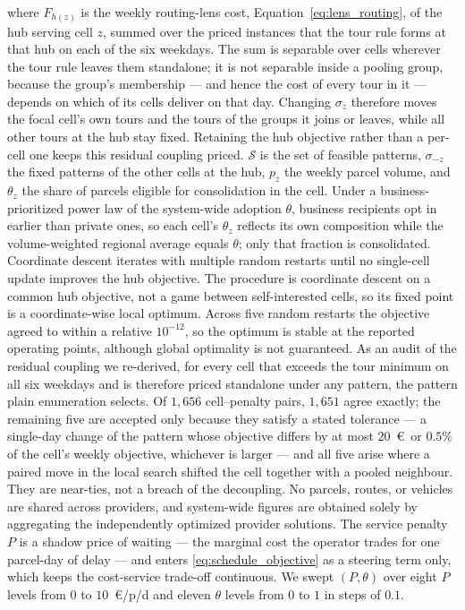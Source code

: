 \documentclass[preprint,12pt,authoryear]{elsarticle}
\begin{document}
where $F_{h(z)}$ is the weekly routing-lens cost, Equation~\eqref{eq:lens_routing}, of the hub serving cell $z$, summed over the priced instances that the tour rule forms at that hub on each of the six weekdays. The sum is separable over cells wherever the tour rule leaves them standalone; it is not separable inside a pooling group, because the group's membership --- and hence the cost of every tour in it --- depends on which of its cells deliver on that day. Changing $\sigma_z$ therefore moves the focal cell's own tours and the tours of the groups it joins or leaves, while all other tours at the hub stay fixed. Retaining the hub objective rather than a per-cell one keeps this residual coupling priced. $\mathcal{S}$ is the set of feasible patterns, $\sigma_{-z}$ the fixed patterns of the other cells at the hub, $p_z$ the weekly parcel volume, and $\theta_z$ the share of parcels eligible for consolidation in the cell. Under a business-prioritized power law of the system-wide adoption $\theta$, business recipients opt in earlier than private ones, so each cell's $\theta_z$ reflects its own composition while the volume-weighted regional average equals $\theta$; only that fraction is consolidated. Coordinate descent iterates with multiple random restarts until no single-cell update improves the hub objective. The procedure is coordinate descent on a common hub objective, not a game between self-interested cells, so its fixed point is a coordinate-wise local optimum. Across five random restarts the objective agreed to within a relative $10^{-12}$, so the optimum is stable at the reported operating points, although global optimality is not guaranteed. As an audit of the residual coupling we re-derived, for every cell that exceeds the tour minimum on all six weekdays and is therefore priced standalone under any pattern, the pattern plain enumeration selects. Of $1{,}656$ cell--penalty pairs, $1{,}651$ agree exactly; the remaining five are accepted only because they satisfy a stated tolerance --- a single-day change of the pattern whose objective differs by at most $20$~\euro\ or $0.5\%$ of the cell's weekly objective, whichever is larger --- and all five arise where a paired move in the local search shifted the cell together with a pooled neighbour. They are near-ties, not a breach of the decoupling.
No parcels, routes, or vehicles are shared across providers, and system-wide figures are obtained solely by aggregating the independently optimized provider solutions. The service penalty $P$ is a shadow price \citep{BoydVandenberghe2004} of waiting --- the marginal cost the operator trades for one parcel-day of delay --- and enters \eqref{eq:schedule_objective} as a steering term only, which keeps the cost-service trade-off continuous. We swept $(P, \theta)$ over eight $P$ levels from $0$ to $10$~\euro/p/d and eleven $\theta$ levels from $0$ to $1$ in steps of $0.1$.
\end{document}
